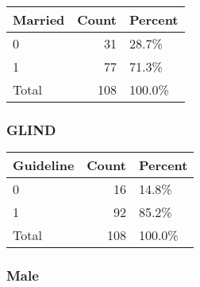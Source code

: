 \documentclass[]{article}
\newenvironment{Shaded}{\begin{snugshade}}{\end{snugshade}}
\newcommand{\DataTypeTok}[1]{\textcolor[rgb]{0.13,0.29,0.53}{#1}}
\newcommand{\KeywordTok}[1]{\textcolor[rgb]{0.13,0.29,0.53}{\textbf{#1}}}
\newcommand{\NormalTok}[1]{#1}
\newcommand{\OperatorTok}[1]{\textcolor[rgb]{0.81,0.36,0.00}{\textbf{#1}}}
\newcommand{\OtherTok}[1]{\textcolor[rgb]{0.56,0.35,0.01}{#1}}
\newcommand{\StringTok}[1]{\textcolor[rgb]{0.31,0.60,0.02}{#1}}
\begin{document}
\begin{table}[H]
\centering
\begin{tabular}{l|r|l}
\hline
Married & Count & Percent\\
\hline
0 & 31 & 28.7\%\\
\hline
1 & 77 & 71.3\%\\
\hline
Total & 108 & 100.0\%\\
\hline
\end{tabular}
\end{table}

\hypertarget{glind-1}{%
\subsubsection{GLIND}\label{glind-1}}

\begin{Shaded}
\end{Shaded}

\begin{table}[H]
\centering
\begin{tabular}{l|r|l}
\hline
Guideline & Count & Percent\\
\hline
0 & 16 & 14.8\%\\
\hline
1 & 92 & 85.2\%\\
\hline
Total & 108 & 100.0\%\\
\hline
\end{tabular}
\end{table}

\hypertarget{male-2}{%
\subsubsection{Male}\label{male-2}}
\end{document}

